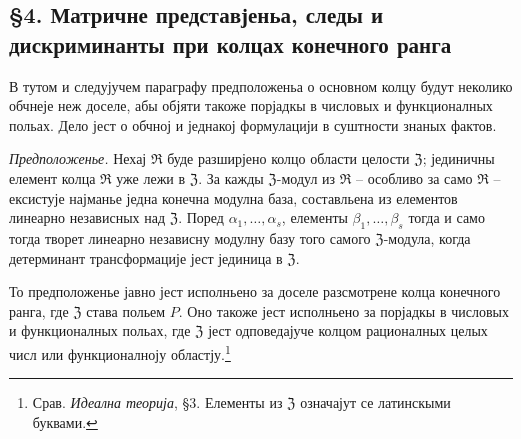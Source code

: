 \documentclass[11pt]{article}
\begin{document}
\setcounter{footnote}{23}

\subsection*{§4. Матричне представјеньа, следы и дискриминанты при колцах конечного ранга}

В тутом и следујучем параграфу предположеньа о основном колцу будут неколико обчнеје неж доселе, абы објяти такоже порјадкы в числовых и функционалных польах. Дело јест о обчној и једнакој формулацији в суштности знаных фактов.

\emph{Предположенье.} Нехај $\mathfrak R$ буде разширјено колцо области целости $\mathfrak Z$; јединичны елемент колца $\mathfrak R$ уже лежи в $\mathfrak Z$. За кажды $\mathfrak Z$-модул из $\mathfrak R$ -- особливо за само $\mathfrak R$ -- ексистује најманье једна конечна модулна база, составльена из елементов линеарно независных над $\mathfrak Z$. Поред $\alpha_1,\ldots,\alpha_s$, елементы $\beta_1,\ldots,\beta_s$ тогда и само тогда творет линеарно независну модулну базу того самого $\mathfrak Z$-модула, когда детерминант трансформације јест јединица в $\mathfrak Z$.

То предположенье јавно јест исполньено за доселе разсмотрене колца конечного ранга, где $\mathfrak Z$ става польем $P$. Оно такоже јест исполньено за порјадкы в числовых и функционалных польах, где $\mathfrak Z$ јест одповедајуче колцом рационалных целых числ или функционалноју областју.\footnote{Срав. \emph{Идеална теорија}, §3. Елементы из $\mathfrak Z$ означајут се латинскыми буквами.}
\end{document}
